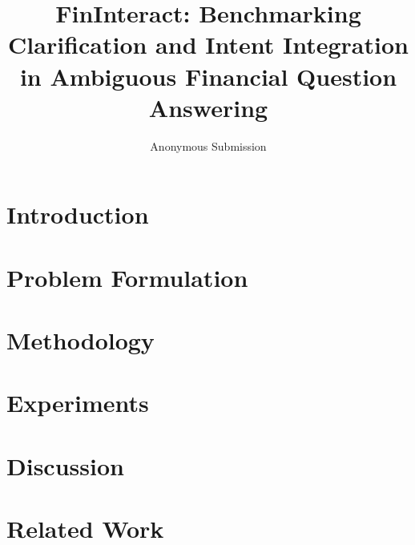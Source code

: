 \documentclass[letterpaper]{article} %
\title{FinInteract: Benchmarking Clarification and Intent Integration in Ambiguous Financial Question Answering}
\author{Anonymous Submission}
\begin{document}
\maketitle

\begin{abstract}

\end{abstract}

\section{Introduction}
\label{sec:intro}


\section{Problem Formulation}
\label{sec:task}



\section{Methodology}
\label{sec:methodology}

\section{Experiments}
\label{sec:exp}
\label{sec:eval}


\section{Discussion}
\label{sec:discussion}
\label{sec:limitations}





\section{Related Work}
\label{sec:related}

\end{document}

